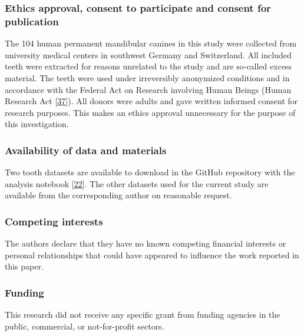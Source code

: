\documentclass[
  american,
]{article}
\begin{document}
\hypertarget{ethics-approval-consent-to-participate-and-consent-for-publication}{%
\subsubsection{Ethics approval, consent to participate and consent for publication}\label{ethics-approval-consent-to-participate-and-consent-for-publication}}

The 104 human permanent mandibular canines in this study were collected from university medical centers in southwest Germany and Switzerland.
All included teeth were extracted for reasons unrelated to the study and are so-called excess material.
The teeth were used under irreversibly anonymized conditions and in accordance with the Federal Act on Research involving Human Beings (Human Research Act {[}\protect\hyperlink{ref-10OKzEtEb}{37}{]}).
All donors were adults and gave written informed consent for research purposes.
This makes an ethics approval unnecessary for the purpose of this investigation.

\hypertarget{availability-of-data-and-materials}{%
\subsubsection{Availability of data and materials}\label{availability-of-data-and-materials}}

Two tooth datasets are available to download in the GitHub repository with the analysis notebook {[}\protect\hyperlink{ref-tZRGGuMm}{22}{]}.
The other datasets used for the current study are available from the corresponding author on reasonable request.

\hypertarget{competing-interests}{%
\subsubsection{Competing interests}\label{competing-interests}}

The authors declare that they have no known competing financial interests or personal relationships that could have appeared to influence the work reported in this paper.

\hypertarget{funding}{%
\subsubsection{Funding}\label{funding}}

This research did not receive any specific grant from funding agencies in the public, commercial, or not-for-profit sectors.
\end{document}
